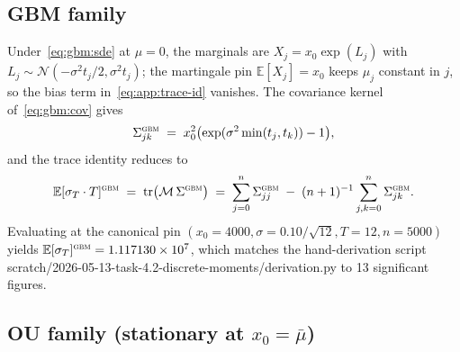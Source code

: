 \documentclass[11pt,letterpaper]{article}
\newcommand{\E}{\mathbb{E}}
\newcommand{\sigmaT}{\sigma_{T}}
\newcommand{\centerProj}{\mathcal{M}}
\begin{document}
\subsection{GBM family}
\label{app:moments:gbm}

Under~\eqref{eq:gbm:sde} at $\mu = 0$, the marginals are
$X_{j} = x_{0}\exp(L_{j})$ with $L_{j} \sim \mathcal{N}(-\sigma^{2}t_{j}/2, \sigma^{2}t_{j})$;
the martingale pin $\E[X_{j}] = x_{0}$ keeps $\mu_{j}$ constant in $j$,
so the bias term in~\eqref{eq:app:trace-id} vanishes. The covariance
kernel of~\eqref{eq:gbm:cov} gives
\begin{equation}
    \Sigma_{jk}^{\textsc{gbm}}
    \;=\;
    x_{0}^{2}\bigl(\exp(\sigma^{2}\min(t_{j}, t_{k})) - 1\bigr),
    \label{eq:app:gbm-Sigma}
\end{equation}
and the trace identity reduces to
\begin{equation}
    \E[\sigmaT \cdot T]^{\textsc{gbm}}
    \;=\;
    \mathrm{tr}\bigl(\centerProj\,\Sigma^{\textsc{gbm}}\bigr)
    \;=\;
    \sum_{j = 0}^{n} \Sigma_{jj}^{\textsc{gbm}}
    \;-\; (n+1)^{-1}\sum_{j,k = 0}^{n}\Sigma_{jk}^{\textsc{gbm}}.
    \label{eq:app:gbm-mean}
\end{equation}
Evaluating at the canonical pin
$(x_{0} = 4000, \sigma = 0.10/\sqrt{12}, T = 12, n = 5000)$ yields
$\E[\sigmaT]^{\textsc{gbm}} = 1.117130 \times 10^{7}$, which matches the
hand-derivation script
\textsf{scratch/2026-05-13-task-4.2-discrete-moments/derivation.py}
to 13 significant figures.

\subsection{OU family (stationary at $x_{0} = \bar\mu$)}
\label{app:moments:ou}
\end{document}
